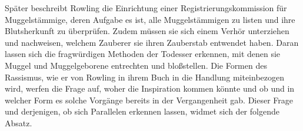 Später beschreibt Rowling die Einrichtung einer \glqq Registrierungskommission für Muggelstämmige\grqq , deren Aufgabe es ist, alle Muggelstämmigen zu listen und ihre Blutsherkunft zu überprüfen. 
Zudem müssen sie sich einem Verhör unterziehen und nachweisen, welchem Zauberer sie ihren Zauberstab entwendet haben\cite [S.268]{JKR10}. 
Daran lassen sich die fragwürdigen Methoden der Todesser erkennen, mit denen sie Muggel und Muggelgeborene entrechten und bloßstellen. 
Die Formen des Rassismus, wie er von Rowling in ihrem Buch in die Handlung miteinbezogen wird, werfen die Frage auf, woher die Inspiration kommen könnte und ob und in welcher Form es solche Vorgänge bereits in der Vergangenheit gab. Dieser Frage und derjenigen, ob sich Parallelen erkennen lassen, widmet sich der folgende Absatz.






